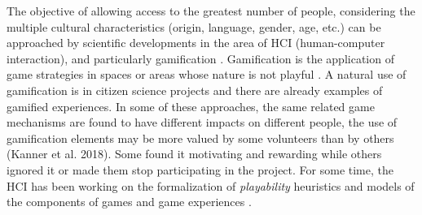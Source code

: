 \documentclass[sigconf]{acmart}
\begin{document}


The objective of allowing access to the greatest number of people, considering the multiple cultural characteristics (origin, language, gender, age, etc.) can be approached by scientific developments in the area of HCI (human-computer interaction), and particularly gamification \cite{Preece2016}. Gamification is the application of game strategies in spaces or areas whose nature is not playful \cite{Deterding2011}. A natural use of gamification is in citizen science projects \cite{Kapp2013} and there are already examples of gamified experiences.  In some of these approaches, the same related game mechanisms are found to have different impacts on different people, the use of gamification elements may be more valued by some volunteers than by others (Kanner et al. 2018). Some found it motivating and rewarding while others ignored it or made them stop participating in the project. 
For some time, the HCI has been working on the formalization of \textit{playability} heuristics and models of the components of games and game experiences \cite{Deterding2011}.
\end{document}
